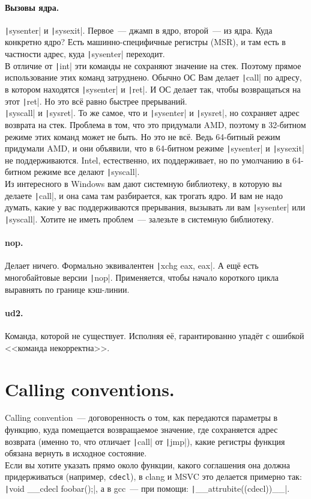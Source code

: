 \documentclass{article}
\begin{document}
    \paragraph{Вызовы ядра.}
    \texttt|sysenter| и \texttt|sysexit|. Первое~--- джамп в ядро, второй~--- из ядра. Куда конкретно ядро? Есть машинно-специфичные регистры (MSR), и там есть в частности адрес, куда \texttt|sysenter| переходит.\\
    В отличие от \texttt|int| эти команды не сохраняют значение на стек. Поэтому прямое использование этих команд затруднено. Обычно ОС Вам делает \texttt|call| по адресу, в котором находятся \texttt|sysenter| и \texttt|ret|. И ОС делает так, чтобы возвращаться на этот \texttt|ret|. Но это всё равно быстрее прерываний.\\
    \texttt|syscall| и \texttt|sysret|. То же самое, что и \texttt|sysenter| и \texttt|sysret|, но сохраняет адрес возврата на стек. Проблема в том, что это придумали AMD, поэтому в 32-битном режиме этих команд может не быть. Но это не всё. Ведь 64-битный режим придумали AMD, и они объявили, что в 64-битном режиме \texttt|sysenter| и \texttt|sysexit| не поддерживаются. Intel, естественно, их поддерживает, но по умолчанию в 64-битном режиме все делают \texttt|syscall|.\\
    Из интересного в Windows вам дают системную библиотеку, в которую вы делаете \texttt|call|, и она сама там разбирается, как трогать ядро. И вам не надо думать, какие у вас поддерживаются прерывания, вызывать ли вам \texttt|sysenter| или \texttt|syscall|. Хотите не иметь проблем~--- залезьте в системную библиотеку.
    \paragraph{nop.}
    Делает ничего. Формально эквивалентен \texttt|xchg eax, eax|. А ещё есть многобайтовые версии \texttt|nop|. Применяется, чтобы начало короткого цикла выравнять по границе кэш-линии.
    \paragraph{ud2.}
    Команда, которой не существует. Исполняя её, гарантированно упадёт с ошибкой <<команда некорректна>>.
    \section{Calling conventions.}
    Calling convention~--- договоренность о том, как передаются параметры в функцию, куда помещается возвращаемое значение, где сохраняется адрес возврата (именно то, что отличает \texttt|call| от \texttt|jmp|), какие регистры функция обязана вернуть в исходное состояние.\\
    Если вы хотите указать прямо около функции, какого соглашения она должна придерживаться (например, \Verb|cdecl|), в clang и MSVC это делается примерно так: \texttt|void __cdecl foobar();|, а в gcc~--- при помощи: \texttt|__attrubite((cdecl))__|.
\end{document}
